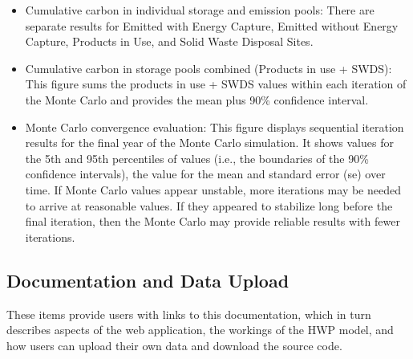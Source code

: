 \documentclass[
  openany]{book}
\providecommand{\tightlist}{%
  \setlength{\itemsep}{0pt}\setlength{\parskip}{0pt}}
\begin{document}
\begin{itemize}
  \begin{itemize}
  \tightlist
  \item
    Cumulative carbon in individual storage and emission pools: There
    are separate results for Emitted with Energy Capture, Emitted
    without Energy Capture, Products in Use, and Solid Waste Disposal
    Sites.\\
  \item
    Cumulative carbon in storage pools combined (Products in use +
    SWDS): This figure sums the products in use + SWDS values within
    each iteration of the Monte Carlo and provides the mean plus 90\%
    confidence interval.\\
  \item
    Monte Carlo convergence evaluation: This figure displays sequential
    iteration results for the final year of the Monte Carlo simulation.
    It shows values for the 5th and 95th percentiles of values (i.e.,
    the boundaries of the 90\% confidence intervals), the value for the
    mean and standard error (se) over time. If Monte Carlo values appear
    unstable, more iterations may be needed to arrive at reasonable
    values. If they appeared to stabilize long before the final
    iteration, then the Monte Carlo may provide reliable results with
    fewer iterations.
  \end{itemize}
\end{itemize}

\hypertarget{app-doc}{%
\subsection{Documentation and Data Upload}\label{app-doc}}

These items provide users with links to this documentation, which in
turn describes aspects of the web application, the workings of the HWP
model, and how users can upload their own data and download the source
code.
\end{document}
